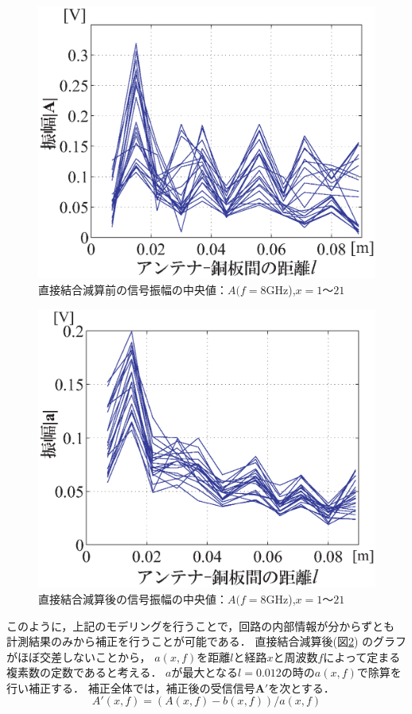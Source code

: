﻿\documentclass[12pt,oneside]{jsbook}
\begin{document}
\begin{figure}[t]
\includegraphics[width =\hsize ]{calib_minsq_hosei_abs_medians.eps}
\caption{直接結合減算前の信号振幅の中央値：$A(f=8$GHz),$x=1〜21$}
\label{all_med_r}
\end{figure}
\begin{figure}
\includegraphics[width =\hsize ]{calib_minsq_hosei_abs_medians_wo_direct.eps}
\caption{直接結合減算後の信号振幅の中央値：$A(f=8$GHz),$x=1〜21$}
\label{all_med_h}
\end{figure}
このように，上記のモデリングを行うことで，回路の内部情報が分からずとも
計測結果のみから補正を行うことが可能である．
直接結合減算後(図\ref{all_med_h})
のグラフがほぼ交差しないことから，
$a(x,f)$を距離$l$と経路$x$と周波数$f$によって定まる複素数の定数であると考える．
$a$が最大となる$l=0.012$の時の$a(x,f)$で除算を行い補正する．
補正全体では，補正後の受信信号${\bm A'}$を次とする．
\begin{equation}
A'(x,f)=(A(x,f)-b(x,f))/a(x,f)
\end{equation}
\end{document}
